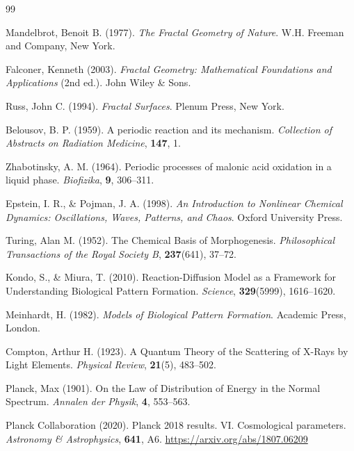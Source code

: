 	\begin{thebibliography}{99}
		
		Mandelbrot, Benoit B. (1977). \textit{The Fractal Geometry of Nature}. 
		W.H. Freeman and Company, New York.
		
		Falconer, Kenneth (2003). \textit{Fractal Geometry: Mathematical Foundations and Applications} (2nd ed.). 
		John Wiley \& Sons.
		
		Russ, John C. (1994). \textit{Fractal Surfaces}. 
		Plenum Press, New York.
		
		Belousov, B. P. (1959). A periodic reaction and its mechanism. 
		\textit{Collection of Abstracts on Radiation Medicine}, \textbf{147}, 1.
		
		Zhabotinsky, A. M. (1964). Periodic processes of malonic acid oxidation in a liquid phase. 
		\textit{Biofizika}, \textbf{9}, 306--311.
		
		Epstein, I. R., \& Pojman, J. A. (1998). \textit{An Introduction to Nonlinear Chemical Dynamics: Oscillations, Waves, Patterns, and Chaos}. 
		Oxford University Press.
		
		Turing, Alan M. (1952). The Chemical Basis of Morphogenesis. 
		\textit{Philosophical Transactions of the Royal Society B}, \textbf{237}(641), 37--72.
		
		Kondo, S., \& Miura, T. (2010). Reaction-Diffusion Model as a Framework for Understanding Biological Pattern Formation. 
		\textit{Science}, \textbf{329}(5999), 1616--1620.
		
		Meinhardt, H. (1982). \textit{Models of Biological Pattern Formation}. 
		Academic Press, London.
		
		Compton, Arthur H. (1923). A Quantum Theory of the Scattering of X-Rays by Light Elements. 
		\textit{Physical Review}, \textbf{21}(5), 483--502.
		
		Planck, Max (1901). On the Law of Distribution of Energy in the Normal Spectrum. 
		\textit{Annalen der Physik}, \textbf{4}, 553--563.
		
		Planck Collaboration (2020). Planck 2018 results. VI. Cosmological parameters. 
		\textit{Astronomy \& Astrophysics}, \textbf{641}, A6.
		\href{https://arxiv.org/abs/1807.06209}{https://arxiv.org/abs/1807.06209}
		

\end{thebibliography}
